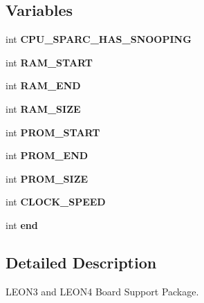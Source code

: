 \subsection*{Variables}
\begin{DoxyCompactItemize}
\item 
\mbox{\label{group__RTEMSBSPsSPARCLEON3_ga8ddd79a76dda208a42abbad0f5463b04}} 
int {\bfseries C\+P\+U\+\_\+\+S\+P\+A\+R\+C\+\_\+\+H\+A\+S\+\_\+\+S\+N\+O\+O\+P\+I\+NG}
\item 
\mbox{\label{group__RTEMSBSPsSPARCLEON3_gad56923b97c04785526fa1b6685aeff10}} 
int {\bfseries R\+A\+M\+\_\+\+S\+T\+A\+RT}
\item 
\mbox{\label{group__RTEMSBSPsSPARCLEON3_ga90a78dabec9a7332292f01d55c2658f7}} 
int {\bfseries R\+A\+M\+\_\+\+E\+ND}
\item 
\mbox{\label{group__RTEMSBSPsSPARCLEON3_ga0d7139422464b757b2dd4d21d1e42b73}} 
int {\bfseries R\+A\+M\+\_\+\+S\+I\+ZE}
\item 
\mbox{\label{group__RTEMSBSPsSPARCLEON3_gab54a93149920df372c48cc75a85de3c2}} 
int {\bfseries P\+R\+O\+M\+\_\+\+S\+T\+A\+RT}
\item 
\mbox{\label{group__RTEMSBSPsSPARCLEON3_gafa99fe4b850d0e2d9926b9e88fa271ce}} 
int {\bfseries P\+R\+O\+M\+\_\+\+E\+ND}
\item 
\mbox{\label{group__RTEMSBSPsSPARCLEON3_ga0e8309e99cf221abd59aa515296aded1}} 
int {\bfseries P\+R\+O\+M\+\_\+\+S\+I\+ZE}
\item 
\mbox{\label{group__RTEMSBSPsSPARCLEON3_ga48501d2b46d84f08b7f1312d4b102cb6}} 
int {\bfseries C\+L\+O\+C\+K\+\_\+\+S\+P\+E\+ED}
\item 
\mbox{\label{group__RTEMSBSPsSPARCLEON3_gabce9f5dc9c83f2639b72024fdee5d388}} 
int {\bfseries end}
\end{DoxyCompactItemize}


\subsection{Detailed Description}
L\+E\+O\+N3 and L\+E\+O\+N4 Board Support Package. 



